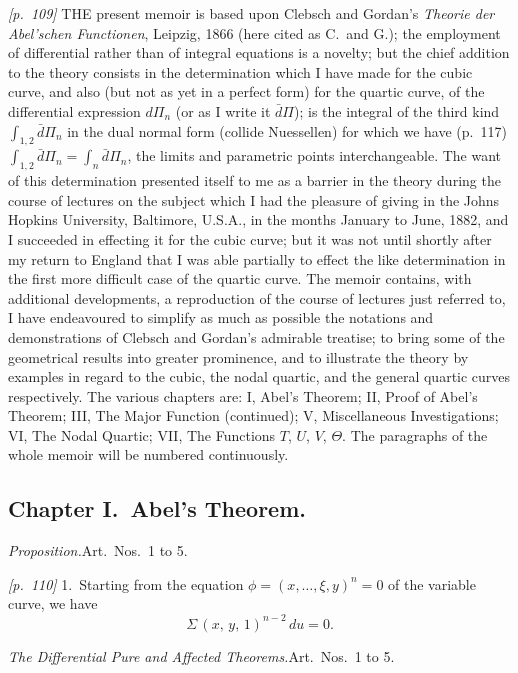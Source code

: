 \documentclass[11pt,a4paper]{book}
\begin{document}
\bigskip

\noindent\textit{[p.~109]} THE present memoir is based upon Clebsch and Gordan's \textit{Theorie der Abel'schen Functionen}, Leipzig, 1866 (here cited as C.\ and G.); the employment of differential rather than of integral equations is a novelty; but the chief addition to the theory consists in the determination which I have made for the cubic curve, and also (but not as yet in a perfect form) for the quartic curve, of the differential expression $d\Pi_n$ (or as I write it $\bar{d}\Pi$); is the integral of the third kind $\int_{1,2}\!\bar{d}\Pi_n$ in the dual normal form (collide Nuessellen) for which we have (p.~117) $\int_{1,2}\!\bar{d}\Pi_n = \int_n \bar{d}\Pi_n$, the limits and parametric points interchangeable. The want of this determination presented itself to me as a barrier in the theory during the course of lectures on the subject which I had the pleasure of giving in the Johns Hopkins University, Baltimore, U.S.A., in the months January to June, 1882, and I succeeded in effecting it for the cubic curve; but it was not until shortly after my return to England that I was able partially to effect the like determination in the first more difficult case of the quartic curve. The memoir contains, with additional developments, a reproduction of the course of lectures just referred to, I have endeavoured to simplify as much as possible the notations and demonstrations of Clebsch and Gordan's admirable treatise; to bring some of the geometrical results into greater prominence, and to illustrate the theory by examples in regard to the cubic, the nodal quartic, and the general quartic curves respectively. The various chapters are: I, Abel's Theorem; II, Proof of Abel's Theorem; III, The Major Function (continued); V, Miscellaneous Investigations; VI, The Nodal Quartic; VII, The Functions $T$, $U$, $V$, $\Theta$. The paragraphs of the whole memoir will be numbered continuously.

\subsection*{Chapter I.\ Abel's Theorem.}

\textit{Proposition.}\quad Art.\ Nos.\ 1 to 5.

\noindent\textit{[p.~110]} 1.\ Starting from the equation $\phi = (x, \ldots, \xi, y)^n = 0$ of the variable curve, we have
\[
\Sigma\,(x,\,y,\,1)^{n-2}\,du = 0.
\]

\textit{The Differential Pure and Affected Theorems.}\quad Art.\ Nos.\ 1 to 5.
\end{document}
